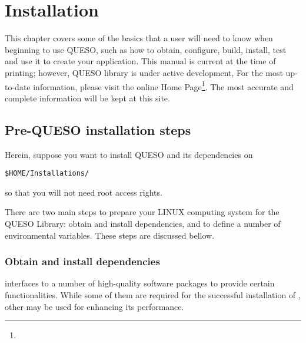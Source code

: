 \chapter{Installation}\label{ch-install}
\thispagestyle{headings}


  
This chapter covers some of the basics that a user will need to know when beginning to use QUESO, such as 
how to obtain, configure, build, install, test \Queso{} and use it to create your application.  This manual is current at the time of
printing; however, QUESO library  is under active development, For the most up-to-date information,
please visit the online \Queso{} Home Page\footnote{\Quesoweb}. The most accurate and complete information will be kept at this site.



        
\section{Pre-QUESO installation steps}\label{sec:Pre_Queso}


Herein, suppose you want to install QUESO and its dependencies on 
\begin{lstlisting}
$HOME/Installations/
\end{lstlisting}
%
so that you will not need root access rights. 

There are two main steps to prepare your LINUX computing system  for  the QUESO Library: obtain and install \Queso{} dependencies, and to define a number of environmental variables. These steps are discussed bellow.


\subsection{Obtain and install \Queso{} dependencies}

\Queso{} interfaces to a number of high-quality software packages to provide certain functionalities. While some of them are required for the successful installation of \Queso{}, other may be used for enhancing its performance. 

